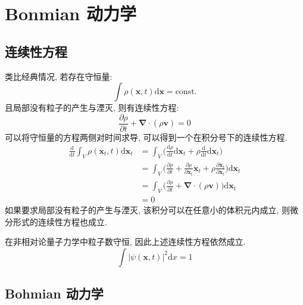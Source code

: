 \chapter{Bonmian 动力学}
    \section{连续性方程}

        类比经典情况, 若存在守恒量:
        \begin{equation}
            \int \rho (\bm{x},t) \mathrm{d} \bm{x} = \text{const.}
        \end{equation}
        且局部没有粒子的产生与湮灭, 则有连续性方程:
        \begin{equation}
            \frac {\partial \rho}{\partial t} + \bm{\nabla} \cdot (\rho \bm{v}) = 0
        \end{equation}
        可以将守恒量的方程两侧对时间求导, 可以得到一个在积分号下的连续性方程. 
        \begin{equation}\begin{aligned}
            \frac{\mathrm{d}}{\mathrm{d}t} \int_V \rho (\bm{x}_t, t) \mathrm{d} \bm{x}_t
            & = \int_V \bigg( \frac{\mathrm{d}\rho}{\mathrm{d}t} \mathrm{d} \bm{x}_t + \rho \frac{\mathrm{d}}{\mathrm{d}t} \mathrm{d} \bm{x}_t\bigg) \\
            & = \int_V \bigg( \frac{\partial \rho}{\partial t} + \frac{\partial \rho}{\partial \bm{x}_t}\bm{\dot{x}}_t + \rho \frac{\partial \bm{\dot{x}}_t}{\partial \bm{x}_t} \bigg) \mathrm{d} \bm{x}_t \\
            & = \int_V \bigg( \frac {\partial \rho}{\partial t} + \bm{\nabla} \cdot (\rho \bm{v}) \bigg) \mathrm{d} \bm{x}_t \\
            & = 0 
        \end{aligned}\end{equation}
        如果要求局部没有粒子的产生与湮灭, 该积分可以在任意小的体积元内成立, 则微分形式的连续性方程也成立. 

        在非相对论量子力学中粒子数守恒, 因此上述连续性方程依然成立. 
        \begin{equation}
            \int |\psi(\bm{x},t)|^2 \mathrm{d}x = 1
        \end{equation}

    \section{Bohmian 动力学}

